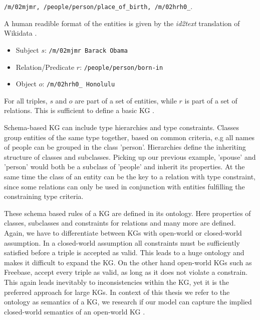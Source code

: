 \begin{center}
    \texttt{/m/02mjmr, /people/person/place\_of\_birth, /m/02hrh0\_}.
\end{center}



A human readible format of the entities is given by the \textit{id2text} translation of Wikidata \cite{vrandevcic2014wikidata}.

\begin{itemize}
    \item Subject $s$:   \texttt{/m/02mjmr Barack Obama}
    \item Relation/Predicate $r$:    \texttt{/people/person/born-in}
    \item Object $o$:     \texttt{/m/02hrh0\_ Honolulu}
\end{itemize}


For all triples, $s$ and $o$ are part of a set of entities, while $r$ is part of a set of relations. This is sufficient to define a basic KG \cite{nickel_review_2016}.

Schema-based KG can include type hierarchies and type constraints. Classes group entities of the same type together, based on common criteria, e.g all names of people can be grouped in the class 'person'. Hierarchies define the inheriting structure of classes and subclasses. Picking up our previous example, 'spouse' and 'person' would both be a subclass of 'people' and inherit its properties. At the same time the class of an entity can be the key to a relation with type constraint, since some relations can only be used in conjunction with entities fulfilling the constraining type criteria.

These schema based rules of a KG are defined in its ontology. Here properties of classes, subclasses and constraints for relations and many more are defined. Again, we have to differentiate between KGs with open-world or closed-world assumption. In a closed-world assumption all constraints must be sufficiently satisfied before a triple is accepted as valid. This leads to a huge ontology and makes it difficult to expand the KG. On the other hand open-world KGs such as Freebase, accept every triple as valid, as long as it does not violate a constrain. This again leads inevitably to inconsistencies within the KG, yet it is the preferred approach for large KGs. In context of this thesis we refer to the ontology as semantics of a KG, we research if our model can capture the implied closed-world semantics of an open-world KG \cite{nickel_review_2016}.

